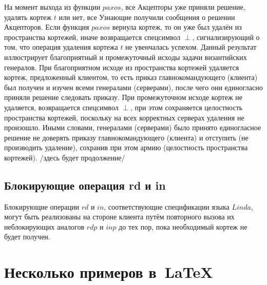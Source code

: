 На момент выхода из функции $paxos$, все Акцепторы уже приняли решение, удалять кортеж $t$ или нет, все Узнающие получили сообщения о решении Акцепторов. Если функция $paxos$ вернула кортеж, то он уже был удалён из пространства кортежей, иначе возвращается спецсимвол $\perp$, сигнализирующий о том, что операция удаления кортежа $t$ не увенчалась успехом. Данный результат иллюстрирует благоприятный и промежуточный исходы задачи византийских генералов. При благоприятном исходе из пространства кортежей удаляется кортеж, предложенный клиентом, то есть приказ главнокомандующего (клиента) был получен и изучен всеми генералами (серверами), после чего они единогласно приняли решение следовать приказу. При промежуточном исходе кортеж не удаляется, возвращается спецсимвол $\perp$, при этом сохраняется целостность пространства кортежей, поскольку на всех корректных серверах удаления не произошло. Иными словами, генералами (серверами) было принято единогласное решение не доверять приказу главнокомандующего (клиента) и отступить (не производить удаление), сохранив при этом армию (целостность пространства кортежей).
/здесь будет продолжение/

\subsection{Блокирующие операция rd и in}\label{subsec5:4}
Блокирующие операции $rd$ и $in$, соответствующие спецификации языка $Linda$, могут быть реализованы на стороне клиента путём повторного вызова их неблокирующих аналогов $rdp$ и $inp$ до тех пор, пока необходимый кортеж не будет получен.

\section{Несколько примеров в~\LaTeX{}}
\label{sec:examples}
